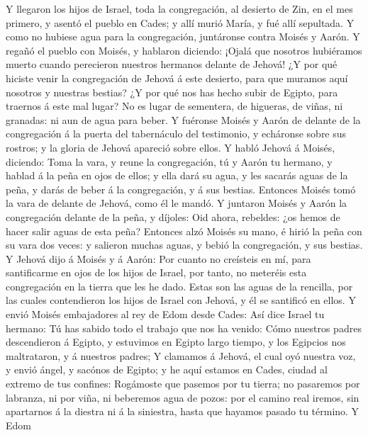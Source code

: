  Y llegaron los hijos de Israel, toda la congregación, al
desierto de Zin, en el mes primero, y asentó el pueblo en Cades; y allí
murió María, y fué allí sepultada.  Y como no hubiese agua
para la congregación, juntáronse contra Moisés y Aarón.  Y
regañó el pueblo con Moisés, y hablaron diciendo: ¡Ojalá que nosotros
hubiéramos muerto cuando perecieron nuestros hermanos delante de Jehová!
 ¿Y por qué hiciste venir la congregación de Jehová á este
desierto, para que muramos aquí nosotros y nuestras bestias?
 ¿Y por qué nos has hecho subir de Egipto, para traernos á
este mal lugar? No es lugar de sementera, de higueras, de viñas, ni
granadas: ni aun de agua para beber.  Y fuéronse Moisés y
Aarón de delante de la congregación á la puerta del tabernáculo del
testimonio, y echáronse sobre sus rostros; y la gloria de Jehová
apareció sobre ellos.  Y habló Jehová á Moisés, diciendo:
 Toma la vara, y reune la congregación, tú y Aarón tu
hermano, y hablad á la peña en ojos de ellos; y ella dará su agua, y les
sacarás aguas de la peña, y darás de beber á la congregación, y á sus
bestias.  Entonces Moisés tomó la vara de delante de
Jehová, como él le mandó.  Y juntaron Moisés y Aarón la
congregación delante de la peña, y díjoles: Oid ahora, rebeldes: ¿os
hemos de hacer salir aguas de esta peña?  Entonces alzó
Moisés su mano, é hirió la peña con su vara dos veces: y salieron muchas
aguas, y bebió la congregación, y sus bestias.  Y Jehová
dijo á Moisés y á Aarón: Por cuanto no creísteis en mí, para
santificarme en ojos de los hijos de Israel, por tanto, no meteréis esta
congregación en la tierra que les he dado.  Estas son las
aguas de la rencilla, por las cuales contendieron los hijos de Israel
con Jehová, y él se santificó en ellos.  Y envió Moisés
embajadores al rey de Edom desde Cades: Así dice Israel tu hermano: Tú
has sabido todo el trabajo que nos ha venido:  Cómo
nuestros padres descendieron á Egipto, y estuvimos en Egipto largo
tiempo, y los Egipcios nos maltrataron, y á nuestros padres;
 Y clamamos á Jehová, el cual oyó nuestra voz, y envió
ángel, y sacónos de Egipto; y he aquí estamos en Cades, ciudad al
extremo de tus confines:  Rogámoste que pasemos por tu
tierra; no pasaremos por labranza, ni por viña, ni beberemos agua de
pozos: por el camino real iremos, sin apartarnos á la diestra ni á la
siniestra, hasta que hayamos pasado tu término.  Y Edom
